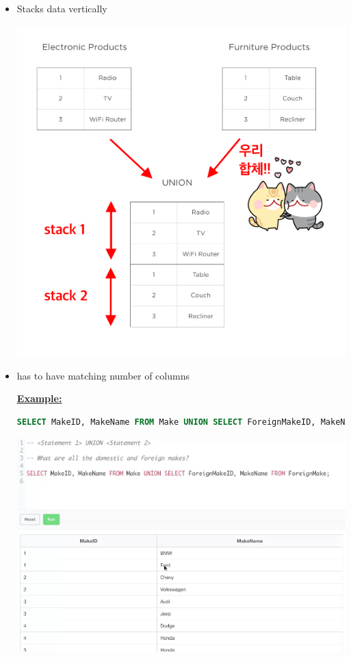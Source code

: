\documentclass[12pt]{article}
\begin{document}
\begin{itemize}
    \item Stacks data vertically

    \begin{center}
    \includegraphics[width=0.8\linewidth]{images/part_5_notes_2.png}
    \end{center}

    \item has to have matching number of columns

    \bigskip

    \underline{\textbf{Example:}}

    \bigskip

    \begin{lstlisting}[language=SQL]
    SELECT MakeID, MakeName FROM Make UNION SELECT ForeignMakeID, MakeName FROM ForeignMake;
    \end{lstlisting}

    \bigskip

    \begin{center}
    \includegraphics[width=0.8\linewidth]{images/part_5_notes_1.png}
    \end{center}

\end{itemize}
\end{document}
